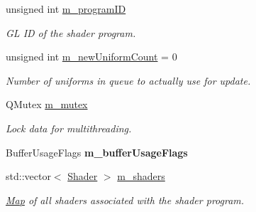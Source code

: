 \begin{DoxyCompactItemize}
\item 
\mbox{\label{classrev_1_1_shader_program_af39f9e267f4d22a150f741e623b2d226}} 
unsigned int \mbox{\hyperlink{classrev_1_1_shader_program_af39f9e267f4d22a150f741e623b2d226}{m\+\_\+program\+ID}}
\begin{DoxyCompactList}\small\item\em GL ID of the shader program. \end{DoxyCompactList}\item 
\mbox{\label{classrev_1_1_shader_program_a6d613a53edd27eb503722f080bffdbe2}} 
unsigned int \mbox{\hyperlink{classrev_1_1_shader_program_a6d613a53edd27eb503722f080bffdbe2}{m\+\_\+new\+Uniform\+Count}} = 0
\begin{DoxyCompactList}\small\item\em Number of uniforms in queue to actually use for update. \end{DoxyCompactList}\item 
\mbox{\label{classrev_1_1_shader_program_a8854efa5e272052609f9bedc1db74aa8}} 
Q\+Mutex \mbox{\hyperlink{classrev_1_1_shader_program_a8854efa5e272052609f9bedc1db74aa8}{m\+\_\+mutex}}
\begin{DoxyCompactList}\small\item\em Lock data for multithreading. \end{DoxyCompactList}\item 
\mbox{\label{classrev_1_1_shader_program_a80bf75cf281f480736ad65be6e25444b}} 
Buffer\+Usage\+Flags {\bfseries m\+\_\+buffer\+Usage\+Flags}
\item 
std\+::vector$<$ \mbox{\hyperlink{classrev_1_1_shader}{Shader}} $>$ \mbox{\hyperlink{classrev_1_1_shader_program_a3618ab938eba35717c2f2f1f95ab3763}{m\+\_\+shaders}}
\begin{DoxyCompactList}\small\item\em \mbox{\hyperlink{classrev_1_1_map}{Map}} of all shaders associated with the shader program. \end{DoxyCompactList}\item 
\mbox{\label{classrev_1_1_shader_program_a3a2ff90e8bb2a553d28329f425c58824}} 

\end{DoxyCompactItemize}
